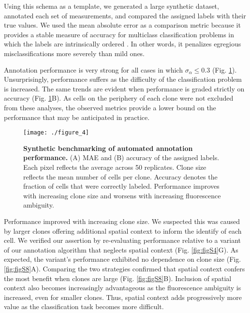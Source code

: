 Using this schema as a template, we generated a large synthetic dataset, annotated each set of measurements, and compared the assigned labels with their true values. We used the mean absolute error as a comparison metric because it provides a stable measure of accuracy for multiclass classification problems in which the labels are intrinsically ordered \cite{Gaudette2009}. In other words, it penalizes egregious misclassifications more severely than mild ones.

Annotation performance is very strong for all cases in which $\sigma_{\alpha} \leq 0.3$ (Fig. \ref{fig:fig4}). Unsurprisingly, performance suffers as the difficulty of the classification problem is increased. The same trends are evident when performance is graded strictly on accuracy (Fig. \ref{fig:fig4}B). As cells on the periphery of each clone were not excluded from these analyses, the observed metrics provide a lower bound on the performance that may be anticipated in practice.

\begin{figure}[t]
\centering
\texttt{[image: ./figure\_4]}
\caption[Synthetic benchmarking of automated annotation performance.]{\textbf{Synthetic benchmarking of automated annotation performance.} (A) MAE and (B) accuracy of the assigned labels. Each pixel reflects the average across 50 replicates. Clone size reflects the mean number of cells per clone. Accuracy denotes the fraction of cells that were correctly labeled. Performance improves with increasing clone size and worsens with increasing fluorescence ambiguity.}
\label{fig:fig4}
\end{figure}

Performance improved with increasing clone size. We suspected this was caused by larger clones offering additional spatial context to inform the identify of each cell. We verified our assertion by re-evaluating performance relative to a variant of our annotation algorithm that neglects spatial context (Fig. \ref{fig:figS4}G). As expected, the variant's performance exhibited no dependence on clone size (Fig. \ref{fig:figS8}A). Comparing the two strategies confirmed that spatial context confers the most benefit when clones are large (Fig. \ref{fig:figS8}B). Inclusion of spatial context also becomes increasingly advantageous as the fluorescence ambiguity is increased, even for smaller clones. Thus, spatial context adds progressively more value as the classification task becomes more difficult.


